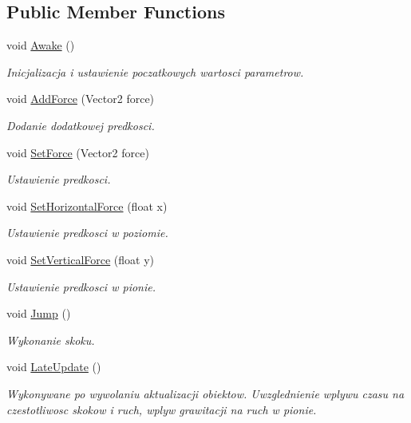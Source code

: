 \subsection*{Public Member Functions}
\begin{DoxyCompactItemize}
\item 
void \hyperlink{class_character_controller2_d_a63dec3eea904614ce11fff4d0b1f3374}{Awake} ()
\begin{DoxyCompactList}\small\item\em Inicjalizacja i ustawienie poczatkowych wartosci parametrow. \end{DoxyCompactList}\item 
void \hyperlink{class_character_controller2_d_adbd530fe94a846d57ed2c9f322491ab3}{Add\+Force} (Vector2 force)
\begin{DoxyCompactList}\small\item\em Dodanie dodatkowej predkosci. \end{DoxyCompactList}\item 
void \hyperlink{class_character_controller2_d_a5ed35a778ec714e5783d6f0570bca703}{Set\+Force} (Vector2 force)
\begin{DoxyCompactList}\small\item\em Ustawienie predkosci. \end{DoxyCompactList}\item 
void \hyperlink{class_character_controller2_d_a8fd797b25fef289cbc1993f94dfb9b48}{Set\+Horizontal\+Force} (float x)
\begin{DoxyCompactList}\small\item\em Ustawienie predkosci w poziomie. \end{DoxyCompactList}\item 
void \hyperlink{class_character_controller2_d_a29d14b0bb79f8661d9655ab9bed074e2}{Set\+Vertical\+Force} (float y)
\begin{DoxyCompactList}\small\item\em Ustawienie predkosci w pionie. \end{DoxyCompactList}\item 
void \hyperlink{class_character_controller2_d_aa42cc475784c2a2f5ca406669504824e}{Jump} ()
\begin{DoxyCompactList}\small\item\em Wykonanie skoku. \end{DoxyCompactList}\item 
void \hyperlink{class_character_controller2_d_aa16cb1f7b8c01f326f8b0b1508590dd7}{Late\+Update} ()
\begin{DoxyCompactList}\small\item\em Wykonywane po wywolaniu aktualizacji obiektow. Uwzglednienie wplywu czasu na czestotliwosc skokow i ruch, wplyw grawitacji na ruch w pionie. \end{DoxyCompactList}\item 

\end{DoxyCompactItemize}

